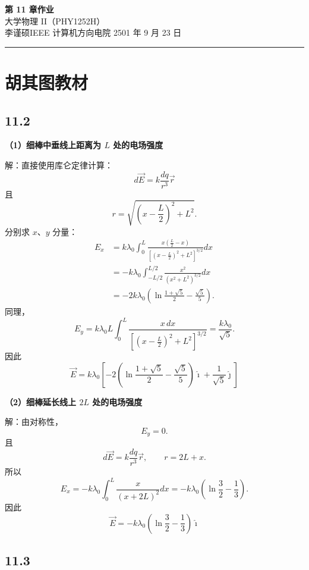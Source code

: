 \documentclass[UTF8,a4paper,12pt]{ctexart}
\begin{document}
\begin{center}
  {\LARGE\bfseries 第 11 章作业}\\[0.55em]
  {\normalsize 大学物理 II（PHY1252H）}\\[0.95em]
  {\small 李谨硕\quad IEEE 计算机方向\quad 电院 2501 年 9 月 23 日}
\end{center}
\vspace{-0.2em}
{\centering\textcolor{black!30}{\rule{0.9\textwidth}{0.8pt}}\par}
\vspace{0.6em}

\section*{胡其图教材}

\subsection*{11.2}

\textbf{（1）细棒中垂线上距离为 $L$ 处的电场强度}

解：直接使用库仑定律计算：
\[
d\vec{E}=k\frac{dq}{r^3}\vec{r}
\]
且
\[
r=\sqrt{\left(x-\frac{L}{2}\right)^2+L^2}.
\]
分别求 $x$、$y$ 分量：
\[
\begin{aligned}
E_x
&=
k\lambda_0
\int_0^L
\frac{x\left(\frac{L}{2}-x\right)}
{\left[\left(x-\frac{L}{2}\right)^2+L^2\right]^{3/2}}dx\\
&=
-k\lambda_0
\int_{-L/2}^{L/2}
\frac{x^2}{(x^2+L^2)^{3/2}}dx\\
&=
-2k\lambda_0
\left(
\ln\frac{1+\sqrt{5}}{2}
-\frac{\sqrt{5}}{5}
\right).
\end{aligned}
\]
同理，
\[
E_y
=
k\lambda_0L
\int_0^L
\frac{x\,dx}
{\left[\left(x-\frac{L}{2}\right)^2+L^2\right]^{3/2}}
=
\frac{k\lambda_0}{\sqrt{5}}.
\]
因此
\[
\boxed{
\vec{E}=
k\lambda_0
\left[
-2\left(
\ln\frac{1+\sqrt{5}}{2}
-\frac{\sqrt{5}}{5}
\right)\hat{\imath}
+
\frac{1}{\sqrt{5}}\hat{\jmath}
\right]
}
\]

\textbf{（2）细棒延长线上 $2L$ 处的电场强度}

解：由对称性，
\[
E_y=0.
\]
且
\[
d\vec{E}=k\frac{dq}{r^3}\vec{r},
\qquad r=2L+x.
\]
所以
\[
E_x
=
-k\lambda_0
\int_0^L
\frac{x}{(x+2L)^2}dx
=
-k\lambda_0
\left(
\ln\frac{3}{2}-\frac{1}{3}
\right).
\]
因此
\[
\boxed{
\vec{E}
=
-k\lambda_0
\left(
\ln\frac{3}{2}-\frac{1}{3}
\right)\hat{\imath}
}
\]

\subsection*{11.3}
\end{document}
